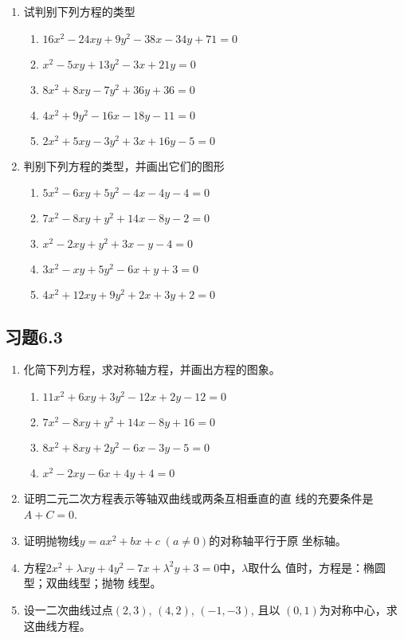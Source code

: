 \begin{ex}
\begin{enumerate}
    \item 试判别下列方程的类型
\begin{enumerate}
\item $16x^2-24xy+9y^2-38x-34y+71=0$
\item $x^2-5xy+13y^2-3x+21y=0$
\item $8x^2+8xy-7y^2+36y+36=0$
\item $4x^2+9y^2-16x-18y-11=0$
\item $2x^2+5xy-3y^2+3x+16y-5=0$
\end{enumerate}

    \item 判别下列方程的类型，并画出它们的图形
\begin{enumerate}
\item $5x^2-6xy+5y^2-4x-4y-4=0$
\item $7x^2-8xy+y^2+14x-8y-2=0$
\item $x^2-2xy+y^2+3x-y-4=0$
\item $3x^2-xy+5y^2-6x+y+3=0$
\item $4x^2+12xy+9y^2+2x+3y+2=0$   
\end{enumerate}

\end{enumerate}    
\end{ex}

\subsection*{习题6.3}
\begin{enumerate}
    \item 化简下列方程，求对称轴方程，并画出方程的图象。
\begin{enumerate}
    \item $11x^2+6xy+3y^2-12x+2y-12=0$
    \item $7x^2-8xy+y^2+14x-8y+16=0$
    \item $8x^2+8xy+2y^2-6x-3y-5=0$
    \item $x^2-2xy-6x+4y+4=0$
\end{enumerate}

\item 证明二元二次方程表示等轴双曲线或两条互相垂直的直
线的充要条件是$A+C=0$.
\item 证明抛物线$y=ax^2+bx+c\; (a\ne 0)$的对称轴平行于原
坐标轴。
\item 方程$2x^2+\lambda xy+4y^2-7x+\lambda^2y+3=0$中，$\lambda$取什么
值时，方程是：椭圆型；双曲线型；抛物
线型。
\item 设一二次曲线过点$(2,3)$, $(4,2)$, $(-1,-3)$, 且以
$(0,1)$为对称中心，求这曲线方程。
\end{enumerate}

